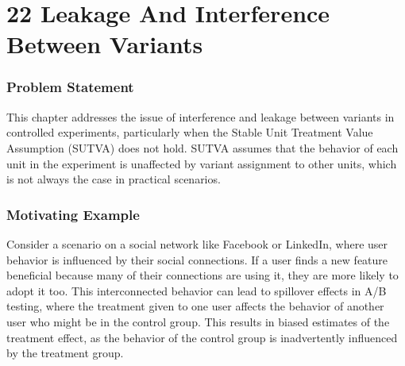 \documentclass{article}
\begin{document}
\section*{22 Leakage And Interference Between Variants}
\subsubsection*{Problem Statement}
This chapter addresses the issue of interference and leakage between variants in controlled experiments, particularly when the Stable Unit Treatment Value Assumption (SUTVA) does not hold. SUTVA assumes that the behavior of each unit in the experiment is unaffected by variant assignment to other units, which is not always the case in practical scenarios.

\subsubsection*{Motivating Example}
Consider a scenario on a social network like Facebook or LinkedIn, where user behavior is influenced by their social connections. If a user finds a new feature beneficial because many of their connections are using it, they are more likely to adopt it too. This interconnected behavior can lead to spillover effects in A/B testing, where the treatment given to one user affects the behavior of another user who might be in the control group. This results in biased estimates of the treatment effect, as the behavior of the control group is inadvertently influenced by the treatment group.
\end{document}
